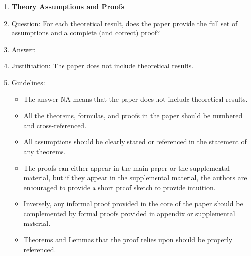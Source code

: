\documentclass[letterpaper]{article}
\begin{document}
\begin{enumerate}
\item {\bf Theory Assumptions and Proofs}
    \item[] Question: For each theoretical result, does the paper provide the full set of assumptions and a complete (and correct) proof?
    \item[] Answer: \answerNA{} %
    \item[] Justification: The paper does not include theoretical results.
    \item[] Guidelines:
    \begin{itemize}
        \item The answer NA means that the paper does not include theoretical results. 
        \item All the theorems, formulas, and proofs in the paper should be numbered and cross-referenced.
        \item All assumptions should be clearly stated or referenced in the statement of any theorems.
        \item The proofs can either appear in the main paper or the supplemental material, but if they appear in the supplemental material, the authors are encouraged to provide a short proof sketch to provide intuition. 
        \item Inversely, any informal proof provided in the core of the paper should be complemented by formal proofs provided in appendix or supplemental material.
        \item Theorems and Lemmas that the proof relies upon should be properly referenced. 
    \end{itemize}


\end{enumerate}
\end{document}
